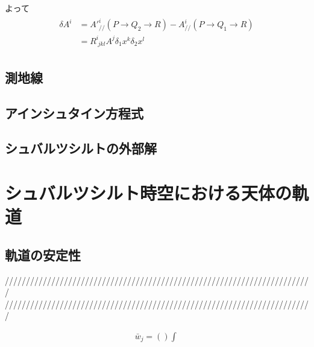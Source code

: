 \documentclass[dvipdfmx]{report} %
\begin{document}
よって
\begin{eqnarray*}
\begin{split}
	\delta A^i 
	&= 	A'^{i}_{/\!/}(P \rightarrow Q_2 \rightarrow R)
		- A^{i}_{/\!/}(P \rightarrow Q_1 \rightarrow R) \\
	&= R^{i}_{\;jkl} A^j \delta_1 x^k \delta_2 x^l
\end{split}
\end{eqnarray*}


\section{測地線}


\section{アインシュタイン方程式}


\section{シュバルツシルトの外部解}


\chapter{シュバルツシルト時空における天体の軌道}
\section{軌道の安定性}


/////////////////////////////////////////////////////////////////////////\\
/////////////////////////////////////////////////////////////////////////

\begin{equation*}
\begin{split}
	\bar{w}_j = \left( \right) \int^{}_{}
\end{split}
\end{equation*}
\end{document}
